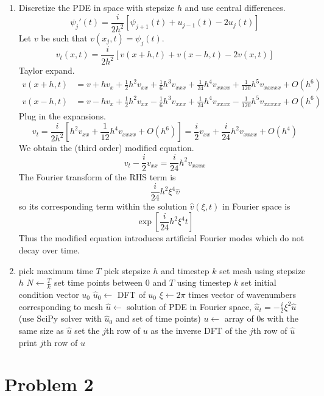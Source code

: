 \documentclass{article}
\newcommand{\sbr}[1]{\left[#1\right]}
\begin{document}
\begin{enumerate}[label=(\alph*)]
\item
Discretize the PDE in space with stepsize $h$ and use central differences.
$$\psi_j'(t) = \frac{i}{2h^2}[\psi_{j+1}(t) + u_{j-1}(t) - 2u_j(t)]$$
Let $v$ be such that $v(x_j,t)=\psi_j(t)$.
$$v_t(x,t) = \frac{i}{2h^2}[v(x+h,t) + v(x-h,t) - 2v(x,t)]$$
Taylor expand.
\begin{align*}
	v(x+h,t) &= v + hv_x + \frac12h^2v_{xx} + \frac16h^3v_{xxx} + \frac{1}{24}h^4v_{xxxx} + \frac{1}{120}h^5v_{xxxxx} + O(h^6)\\
	v(x-h,t) &= v - hv_x + \frac12h^2v_{xx} - \frac16h^3v_{xxx} + \frac{1}{24}h^4v_{xxxx} - \frac{1}{120}h^5v_{xxxxx} + O(h^6)
\end{align*}
Plug in the expansions.
$$v_t = \frac{i}{2h^2}\sbr{h^2v_{xx} + \frac{1}{12}h^4v_{xxxx} + O(h^6)}
= \frac i2v_{xx} + \frac{i}{24}h^2v_{xxxx} + O(h^4)$$
We obtain the (third order) modified equation.
$$v_t - \frac i2v_{xx} = \frac{i}{24}h^2v_{xxxx}$$
The Fourier transform of the RHS term is
$$\frac{i}{24}h^2\xi^4\hat v$$
so its corresponding term within the solution $\hat v(\xi,t)$ in Fourier space is
$$\exp[\frac{i}{24}h^2\xi^4t]$$
Thus the modified equation introduces artificial Fourier modes which do not decay over time.


\item
\begin{algorithmic}
	\State pick maximum time $T$
	\State pick stepsize $h$ and timestep $k$
	\State set mesh using stepsize $h$
	\State $N \gets \frac Tk$
	\State set time points between 0 and $T$ using timestep $k$
	\State set initial condition vector $u_0$
	\State $\hat u_0 \gets$ DFT of $u_0$
	\State $\xi \gets 2\pi$ times vector of wavenumbers corresponding to mesh
	\State $\hat u \gets$ solution of PDE in Fourier space, $\hat u_t=-\frac i2\xi^2\hat u$ (use SciPy solver with $\hat u_0$ and set of time points)
	\State $u \gets$ array of 0s with the same size as $\hat u$
		\State set the $j$th row of $u$ as the inverse DFT of the $j$th row of $\hat u$
	\EndFor
			\State print $j$th row of $u$
		\EndIf
	\EndFor
\end{algorithmic}

\end{enumerate}



\section*{Problem 2}
\end{document}
